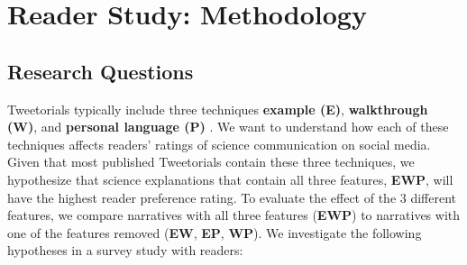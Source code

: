 \section{Reader Study: Methodology}







\subsection{Research Questions}
Tweetorials typically include three techniques \textbf{example (E)}, \textbf{walkthrough (W)}, and \textbf{personal language (P)} \cite{10.1145/3479566}. We want to understand how each of these techniques affects readers' ratings of science communication on social media. Given that most published Tweetorials contain these three techniques, we hypothesize that science explanations that contain all three features, \textbf{EWP}, will have the highest reader preference rating. To evaluate the effect of the 3 different features, we compare narratives with all three features (\textbf{EWP}) to narratives with one of the features removed (\textbf{EW}, \textbf{EP}, \textbf{WP}). We investigate the following hypotheses in a survey study with readers:

